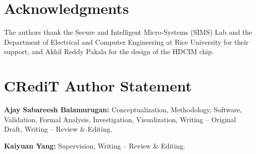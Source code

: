 \documentclass[conference]{IEEEtran}
\begin{document}
\section*{Acknowledgments}
The authors thank the Secure and Intelligent Micro-Systems (SIMS) Lab and the Department of Electrical and
Computer Engineering at Rice University for their support, and Akhil Reddy Pakala for the design of the HDCIM
chip.

\section*{CRediT Author Statement}
\noindent\textbf{Ajay Sabareesh Balamurugan:} Conceptualization, Methodology, Software, Validation, Formal Analysis,
Investigation, Visualization, Writing -- Original Draft, Writing -- Review \& Editing.

\noindent\textbf{Kaiyuan Yang:} Supervision, Writing -- Review \& Editing.



\end{document}
